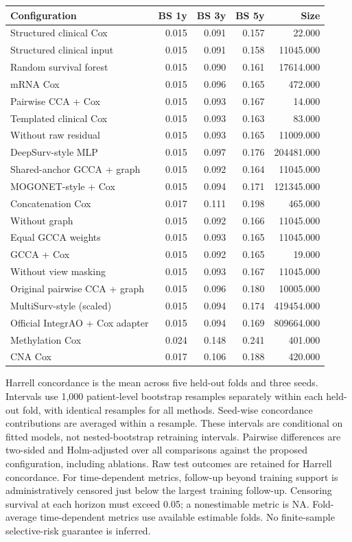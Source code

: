 \documentclass[10pt]{article}
\begin{document}
\begin{center}
\footnotesize
\begin{tabular}{lrrrr}\hline
Configuration & BS 1y & BS 3y & BS 5y & Size\\\hline
Structured clinical Cox & 0.015 & 0.091 & 0.157 & 22.000\\
Structured clinical input & 0.015 & 0.091 & 0.158 & 11045.000\\
Random survival forest & 0.015 & 0.090 & 0.161 & 17614.000\\
mRNA Cox & 0.015 & 0.096 & 0.165 & 472.000\\
Pairwise CCA + Cox & 0.015 & 0.093 & 0.167 & 14.000\\
Templated clinical Cox & 0.015 & 0.093 & 0.163 & 83.000\\
Without raw residual & 0.015 & 0.093 & 0.165 & 11009.000\\
DeepSurv-style MLP & 0.015 & 0.097 & 0.176 & 204481.000\\
Shared-anchor GCCA + graph & 0.015 & 0.092 & 0.164 & 11045.000\\
MOGONET-style + Cox & 0.015 & 0.094 & 0.171 & 121345.000\\
Concatenation Cox & 0.017 & 0.111 & 0.198 & 465.000\\
Without graph & 0.015 & 0.092 & 0.166 & 11045.000\\
Equal GCCA weights & 0.015 & 0.093 & 0.165 & 11045.000\\
GCCA + Cox & 0.015 & 0.092 & 0.165 & 19.000\\
Without view masking & 0.015 & 0.093 & 0.167 & 11045.000\\
Original pairwise CCA + graph & 0.015 & 0.096 & 0.180 & 10005.000\\
MultiSurv-style (scaled) & 0.015 & 0.094 & 0.174 & 419454.000\\
Official IntegrAO + Cox adapter & 0.015 & 0.094 & 0.169 & 809664.000\\
Methylation Cox & 0.024 & 0.148 & 0.241 & 401.000\\
CNA Cox & 0.017 & 0.106 & 0.188 & 420.000\\
\hline\end{tabular}
\end{center}
Harrell concordance is the mean across five held-out folds and
three seeds. Intervals use 1,000 patient-level bootstrap resamples separately
within each held-out fold, with identical resamples for all methods. Seed-wise
concordance contributions are averaged within a resample. These intervals are
conditional on fitted models, not nested-bootstrap retraining intervals.
Pairwise differences are two-sided and Holm-adjusted over all comparisons
against the proposed configuration, including ablations. Raw test outcomes
are retained for Harrell concordance. For time-dependent metrics, follow-up
beyond training support is administratively censored just below the largest
training follow-up. Censoring survival at each horizon must exceed 0.05; a
nonestimable metric is NA. Fold-average time-dependent metrics use available
estimable folds. No finite-sample selective-risk guarantee is inferred.
\end{document}
